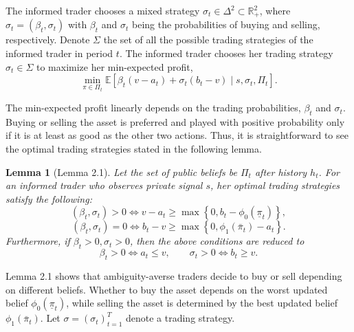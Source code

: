 \documentclass[12pt,a4paper]{article}
\newenvironment{original}{%
  \par\vspace{4pt}\noindent%
  \color{black}%
  \ignorespaces
}{%
  \par\vspace{2pt}%
}
\newtheorem{lemma}[theorem]{Lemma}
\begin{document}
\begin{original}
The informed trader chooses a mixed strategy $\sigma_t \in \Delta^2 \subset \mathbb{R}_+^2$, where $\sigma_t = (\beta_t, \sigma_t)$ with $\beta_t$ and $\sigma_t$ being the probabilities of buying and selling, respectively. Denote $\Sigma$ the set of all the possible trading strategies of the informed trader in period $t$. The informed trader chooses her trading strategy $\sigma_t \in \Sigma$ to maximize her min-expected profit,
\[
\min_{\pi \in \Pi_t} \mathbb{E}[\beta_t(v - a_t) + \sigma_t(b_t - v) \mid s, \sigma_t, \Pi_t]. \tag{2.4}
\]

The min-expected profit linearly depends on the trading probabilities, $\beta_t$ and $\sigma_t$. Buying or selling the asset is preferred and played with positive probability only if it is at least as good as the other two actions. Thus, it is straightforward to see the optimal trading strategies stated in the following lemma.

\begin{lemma}[Lemma 2.1]
Let the set of public beliefs be $\Pi_t$ after history $h_t$. For an informed trader who observes private signal $s$, her optimal trading strategies satisfy the following:
\[
(\beta_t, \sigma_t) > 0 \iff v - a_t \geq \max\left\{0, b_t - \phi_0(\underline{\pi}_t)\right\},
\]
\[
(\beta_t, \sigma_t) = 0 \iff b_t - v \geq \max\left\{0, \phi_1(\bar{\pi}_t) - a_t\right\}.
\]
Furthermore, if $\beta_t > 0, \sigma_t > 0$, then the above conditions are reduced to
\[
\beta_t > 0 \iff a_t \leq v, \qquad \sigma_t > 0 \iff b_t \geq v.
\]
\end{lemma}

Lemma 2.1 shows that ambiguity-averse traders decide to buy or sell depending on different beliefs. Whether to buy the asset depends on the worst updated belief $\phi_0(\underline{\pi}_t)$, while selling the asset is determined by the best updated belief $\phi_1(\bar{\pi}_t)$. Let $\sigma = (\sigma_t)_{t=1}^{T}$ denote a trading strategy.
\end{original}
\end{document}
